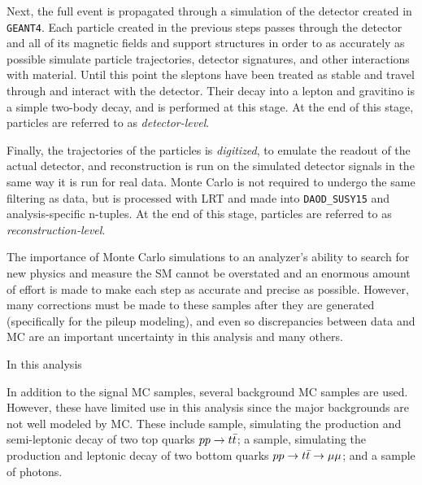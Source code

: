 Next, the full event is propagated through a simulation of the detector created in \texttt{GEANT4}. Each particle created in the previous steps passes through the detector and all of its magnetic fields and support structures in order to as accurately as possible simulate particle trajectories, detector signatures, and other interactions with material. Until this point the sleptons have been treated as stable and travel through and interact with the detector. Their decay into a lepton and gravitino is a simple two-body decay, and is performed at this stage. At the end of this stage, particles are referred to as \emph{detector-level}.

Finally, the trajectories of the particles is \emph{digitized}, to emulate the readout of the actual detector, and reconstruction is run on the simulated detector signals in the same way it is run for real data. Monte Carlo is not required to undergo the same filtering as data, but is processed with \ac{LRT} and made into \texttt{DAOD\_SUSY15} and analysis-specific n-tuples. At the end of this stage, particles are referred to as \emph{reconstruction-level}. 

The importance of Monte Carlo simulations to an analyzer's ability to search for new physics and measure the \ac{SM} cannot be overstated and an enormous amount of effort is made to make each step as accurate and precise as possible. However, many corrections must be made to these samples after they are generated (specifically for the pileup modeling), and even so discrepancies between data and \ac{MC} are an important uncertainty in this analysis and many others.

In this analysis 

In addition to the signal \ac{MC} samples, several background \ac{MC} samples are used. However, these have limited use in this analysis since the major backgrounds are not well modeled by \ac{MC}. These include \ttbar sample, simulating the production and semi-leptonic decay of two top quarks $pp\rightarrow t\bar{t}$; a \bbmm sample, simulating the production and leptonic decay of two bottom quarks $pp\rightarrow t\bar{t} \rightarrow \mu\mu$; and a sample of photons. 




